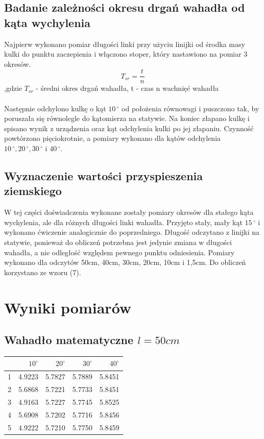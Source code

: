 \documentclass[a4paper,10pt]{article}
\begin{document}
\subsection{Badanie zależności okresu drgań wahadła od kąta wychylenia}
Najpierw wykonano pomiar długości linki przy użyciu linijki od środka masy kulki do punktu zaczepienia  i włączono stoper, który nastawiono na  pomiar 3 okresów. 
\begin{equation}
T_{sr} = \frac{t}{n}
\end{equation}
,gdzie $T_{sr}$ - średni okres drgań wahadła, t - czas n wachnięć wahadła
\\
\\Następnie odchylono kulkę o kąt $10\,^{\circ}$ od położenia równowagi i puszczono tak, by poruszała się równolegle do kątomierza na statywie. Na koniec złapano kulkę i spisano wynik z urządzenia oraz kąt odchylenia kulki po jej złapaniu. Czynność powtórzono pięciokrotnie, a pomiary wykonano dla kątów odchylenia  $10\,^{\circ}, 20\,^{\circ}, 30\,^{\circ}$ i $40\,^{\circ}$.

\subsection{Wyznaczenie wartości przyspieszenia ziemskiego}
W tej części doświadczenia wykonane zostały pomiary okresów dla stałego kąta wychylenia, ale dla różnych długości linki wahadła. Przyjęto stały, mały kąt $15\,^{\circ}$ i wykonano ćwiczenie analogicznie do poprzedniego. Długość odczytano z linijki na statywie, ponieważ do obliczeń potrzebna jest jedynie zmiana w długości wahadła, a nie odległość względem pewnego punktu odniesienia. Pomiary wykonano dla odczytów 50cm, 40cm, 30cm, 20cm, 10cm i 1,5cm. Do obliczeń korzystano ze wzoru (7).

\section{Wyniki pomiarów}
\subsection{Wahadło matematyczne $l=50cm$}
\begin{tabular}{lrrrr}
\toprule
{} &    $10^\circ$ &     $20^\circ$ &      $30^\circ$ &      $40^\circ$\\
\midrule
1 &  4.9223 &  5.7827 &  5.7889 &  5.8451 \\
2 &  5.6868 &  5.7221 &  5.7733 &  5.8451 \\
3 &  4.9163 &  5.7227 &  5.7745 &  5.8525 \\
4 &  5.6908 &  5.7202 &  5.7716 &  5.8456 \\
5 &  4.9222 &  5.7210 &  5.7750 &  5.8459 \\
\bottomrule
\end{tabular}
\end{document}
